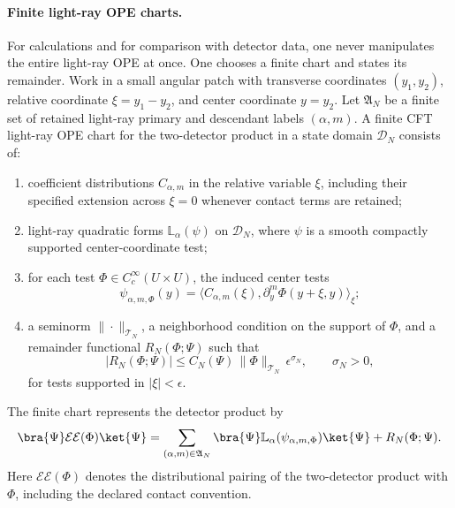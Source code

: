 \paragraph{Finite light-ray OPE charts.}
For calculations and for comparison with detector data, one never manipulates
the entire light-ray OPE at once.  One chooses a finite chart and states its
remainder.  Work in a small angular patch with transverse coordinates
\((y_1,y_2)\), relative coordinate \(\xi=y_1-y_2\), and center coordinate
\(y=y_2\).  Let \(\mathfrak A_N\) be a finite set of retained light-ray
primary and descendant labels \((\alpha,m)\).  A finite CFT light-ray OPE
chart for the two-detector product in a state domain \(\mathcal D_N\)
consists of:
\begin{enumerate}
  \item coefficient distributions \(C_{\alpha,m}\) in the relative variable
  \(\xi\), including their specified extension across \(\xi=0\) whenever
  contact terms are retained;
  \item light-ray quadratic forms
  \(\mathbb L_\alpha(\psi)\) on \(\mathcal D_N\), where \(\psi\) is a smooth
  compactly supported center-coordinate test;
  \item for each test
  \(\Phi\in C_c^\infty(U\times U)\), the induced center tests
  \begin{equation}
    \psi_{\alpha,m,\Phi}(y)
    =
    \bigl\langle C_{\alpha,m}(\xi),
    \partial_y^m\Phi(y+\xi,y)\bigr\rangle_{\xi};
    \label{eq:cft-finite-light-ray-chart-center-test}
  \end{equation}
  \item a seminorm \(\|\cdot\|_{\mathcal T_N}\), a neighborhood condition on
  the support of \(\Phi\), and a remainder functional
  \(R_N(\Phi;\Psi)\) such that
  \begin{equation}
    \left|
      R_N(\Phi;\Psi)
    \right|
    \leq
    C_N(\Psi)\,\|\Phi\|_{\mathcal T_N}\,\epsilon^{\sigma_N},
    \qquad \sigma_N>0,
    \label{eq:cft-finite-light-ray-chart-remainder}
  \end{equation}
  for tests supported in \(|\xi|<\epsilon\).
\end{enumerate}
The finite chart represents the detector product by
\begin{equation}
  \bra{\Psi}\mathcal E\mathcal E(\Phi)\ket{\Psi}
  =
  \sum_{(\alpha,m)\in\mathfrak A_N}
  \bra{\Psi}\mathbb L_\alpha(\psi_{\alpha,m,\Phi})\ket{\Psi}
  +
  R_N(\Phi;\Psi).
  \label{eq:cft-finite-light-ray-chart-expansion}
\end{equation}
Here \(\mathcal E\mathcal E(\Phi)\) denotes the distributional pairing of the
two-detector product with \(\Phi\), including the declared contact convention.

